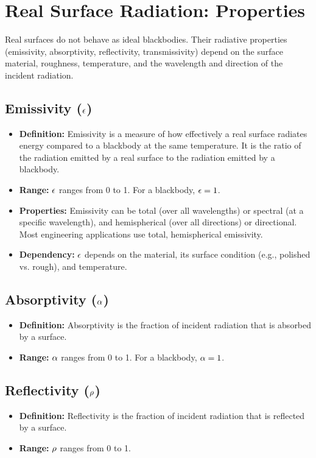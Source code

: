 \section{Real Surface Radiation: Properties}

Real surfaces do not behave as ideal blackbodies. Their radiative properties (emissivity, absorptivity, reflectivity, transmissivity) depend on the surface material, roughness, temperature, and the wavelength and direction of the incident radiation.

\subsection{Emissivity ($\epsilon$)}
\begin{itemize}
    \item \textbf{Definition:} Emissivity is a measure of how effectively a real surface radiates energy compared to a blackbody at the same temperature. It is the ratio of the radiation emitted by a real surface to the radiation emitted by a blackbody.
    \item \textbf{Range:} $\epsilon$ ranges from 0 to 1. For a blackbody, $\epsilon = 1$.
    \item \textbf{Properties:} Emissivity can be total (over all wavelengths) or spectral (at a specific wavelength), and hemispherical (over all directions) or directional. Most engineering applications use total, hemispherical emissivity.
    \item \textbf{Dependency:} $\epsilon$ depends on the material, its surface condition (e.g., polished vs. rough), and temperature.
\end{itemize}

\subsection{Absorptivity ($\alpha$)}
\begin{itemize}
    \item \textbf{Definition:} Absorptivity is the fraction of incident radiation that is absorbed by a surface.
    \item \textbf{Range:} $\alpha$ ranges from 0 to 1. For a blackbody, $\alpha = 1$.
\end{itemize}

\subsection{Reflectivity ($\rho$)}
\begin{itemize}
    \item \textbf{Definition:} Reflectivity is the fraction of incident radiation that is reflected by a surface.
    \item \textbf{Range:} $\rho$ ranges from 0 to 1.
\end{itemize}

